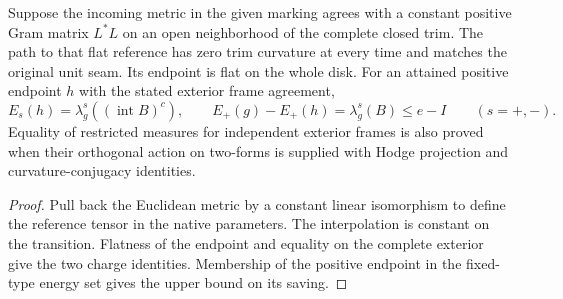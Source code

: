 \begin{proposition}
\label{prop:ed03-native-matched-flat}
\leanok
Suppose the incoming metric in the given marking agrees with a constant
positive Gram matrix $L^*L$ on an open neighborhood of the complete closed
trim. The path to that flat reference has zero trim curvature at every time
and matches the original unit seam. Its endpoint is flat on the whole disk.
For an attained positive endpoint $h$ with the stated exterior frame agreement,
\[
 E_s(h)=\lambda_g^s((\operatorname{int}B)^c),\qquad
 E_+(g)-E_+(h)=\lambda_g^s(B)\le e-I\qquad(s=+,-).
\]
Equality of restricted measures for independent exterior frames is also
proved when their orthogonal action on two-forms is supplied with Hodge
projection and curvature-conjugacy identities.
\end{proposition}
\begin{proof}
\leanok
Pull back the Euclidean metric by a constant linear isomorphism to define the
reference tensor in the native parameters. The interpolation is constant on the
transition. Flatness of the endpoint and equality on the complete exterior
give the two charge identities. Membership of the positive endpoint in the
fixed-type energy set gives the upper bound on its saving.
\end{proof}

